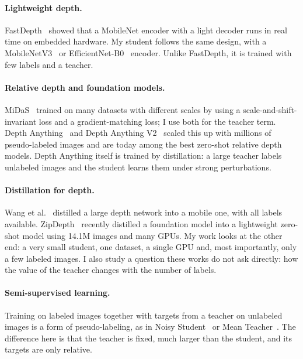 \documentclass[11pt]{article}
\begin{document}
\paragraph{Lightweight depth.} FastDepth~\cite{wofk2019} showed that a MobileNet encoder with a
light decoder runs in real time on embedded hardware. My student follows the same design, with a
MobileNetV3~\cite{howard2019} or EfficientNet-B0~\cite{tan2019} encoder. Unlike FastDepth, it is
trained with few labels and a teacher.

\paragraph{Relative depth and foundation models.} MiDaS~\cite{ranftl2022} trained on many
datasets with different scales by using a scale-and-shift-invariant loss and a gradient-matching
loss; I use both for the teacher term. Depth Anything~\cite{yang2024dav1} and Depth Anything
V2~\cite{yang2024dav2} scaled this up with millions of pseudo-labeled images and are today among
the best zero-shot relative depth models. Depth Anything itself is trained by distillation: a
large teacher labels unlabeled images and the student learns them under strong perturbations.

\paragraph{Distillation for depth.} Wang et al.~\cite{wang2021kd} distilled a large depth network
into a mobile one, with all labels available. ZipDepth~\cite{tosi2026zipdepth} recently distilled
a foundation model into a lightweight zero-shot model using 14.1M images and many GPUs. My work
looks at the other end: a very small student, one dataset, a single GPU and, most importantly,
only a few labeled images. I also study a question these works do not ask directly: how the value
of the teacher changes with the number of labels.

\paragraph{Semi-supervised learning.} Training on labeled images together with targets from a
teacher on unlabeled images is a form of pseudo-labeling, as in Noisy Student~\cite{xie2020} or
Mean Teacher~\cite{tarvainen2017}. The difference here is that the teacher is fixed, much larger
than the student, and its targets are only relative.

\end{document}
